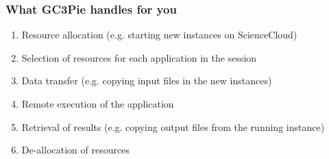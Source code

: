 \documentclass[english,serif,mathserif,xcolor=pdftex,dvipsnames,table]{beamer}
\begin{document}
\begin{frame}
  \frametitle{What GC3Pie handles for you}

  \begin{enumerate}\small
  \item Resource allocation (e.g. starting new instances on
    ScienceCloud)
  \item Selection of resources for each application in the session
  \item Data transfer (e.g. copying input files in the new instances)
  \item Remote execution of the application
  \item Retrieval of results (e.g. copying output files from the
    running instance)
  \item De-allocation of resources
  \end{enumerate}

\end{frame}
\end{document}
